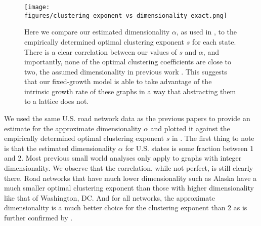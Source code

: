 \begin{figure}[t]
	\centering
	\texttt{[image: figures/clustering\_exponent\_vs\_dimensionality\_exact.png]}
	\vspace*{-\bigskipamount}
	\vspace*{-\medskipamount}
	\caption{
    Here we compare our estimated dimensionality $\alpha$, as used in ,
	to the empirically
    determined optimal clustering exponent $s$ for each state.
	There is a clear correlation between our values of $s$ and $\alpha$, and
    importantly, none of the optimal clustering coefficients are close to two,
    the assumed dimensionality in previous work
    \cite{gila2023highway,goodrich2022modeling,kleinberg2000small}.
    This suggests that our fixed-growth model is able to take advantage of the
    intrinsic growth rate of these graphs in a way that abstracting them to a
    lattice does not.
    \label{fig:clustering_exponent_vs_dimensionality}}
	\vspace*{-\medskipamount}
\end{figure}

We used the same U.S. road network data as the previous papers to provide an
estimate for the approximate dimensionality $\alpha$ and plotted it against the
empirically determined optimal clustering exponent $s$ in
.
The first thing to note is that the estimated dimensionality $\alpha$ for U.S.
states is some fraction between 1 and 2.
Most previous small world analyses only apply to graphs with integer
dimensionality.
We observe that the correlation, while not perfect, is still clearly there.
Road networks that have much lower dimensionality such as Alaska
have a much smaller optimal clustering exponent than those with higher
dimensionality like that of Washington, DC.
And for all networks, the approximate dimensionality is a much better choice for
the clustering exponent than 2
as is further confirmed by . 

